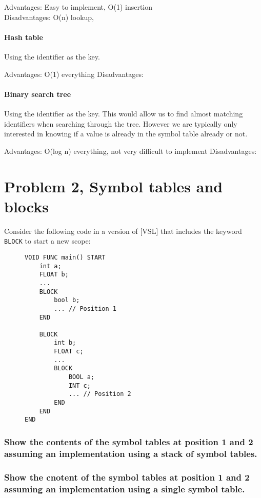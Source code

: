 Advantages: Easy to implement, O(1) insertion\\
Disadvantages: O(n) lookup, 


\paragraph{Hash table}
Using the identifier as the key.

Advantages: O(1) everything
Disadvantages: 

\paragraph{Binary search tree}
Using the identifier as the key.
This would allow us to find almost matching identifiers when searching through the tree.
However we are typically only interested in knowing if a value is already in the symbol table already or not.

Advantages: O(log n) everything, not very difficult to implement
Disadvantages: 

\newpage
\setcounter{subsubsection}{0}
\section{Problem 2, Symbol tables and blocks}
Consider the following code in a version of [VSL] that includes the keyword \texttt{BLOCK} to start a new scope:
\begin{figure}[H]
\begin{verbatim}
VOID FUNC main() START
    int a;
    FLOAT b;
    ...
    BLOCK
        bool b;
        ... // Position 1
    END

    BLOCK
        int b;
        FLOAT c;
        ...
        BLOCK
            BOOL a;
            INT c;
            ... // Position 2
        END
    END
END
\end{verbatim}
\end{figure}

\subsubsection{Show the contents of the symbol tables at position 1 and 2 assuming an implementation using a stack of symbol tables.}

\subsubsection{Show the cnotent of the symbol tables at position 1 and 2 assuming an implementation using a single symbol table.}

